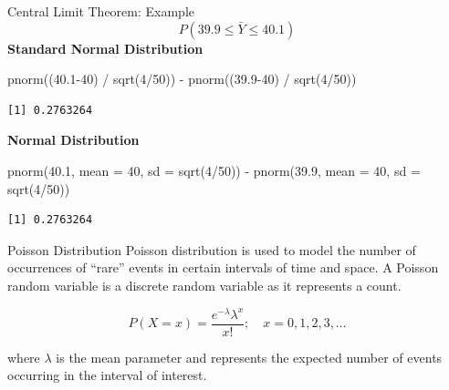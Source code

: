 \documentclass[
  ignorenonframetext,
]{beamer}
\newenvironment{Shaded}{\begin{snugshade}}{\end{snugshade}}
\newcommand{\AttributeTok}[1]{\textcolor[rgb]{0.40,0.45,0.13}{#1}}
\newcommand{\DecValTok}[1]{\textcolor[rgb]{0.68,0.00,0.00}{#1}}
\newcommand{\FloatTok}[1]{\textcolor[rgb]{0.68,0.00,0.00}{#1}}
\newcommand{\FunctionTok}[1]{\textcolor[rgb]{0.28,0.35,0.67}{#1}}
\newcommand{\NormalTok}[1]{\textcolor[rgb]{0.00,0.23,0.31}{#1}}
\newcommand{\SpecialCharTok}[1]{\textcolor[rgb]{0.37,0.37,0.37}{#1}}
\begin{document}
\begin{frame}[fragile]{Central Limit Theorem: Example}
\protect{}\label{central-limit-theorem-example-1}
\[
P(39.9\leq \bar{Y} \leq 40.1)
\] \textbf{Standard Normal Distribution}

\begin{Shaded}
\begin{Highlighting}[]
\FunctionTok{pnorm}\NormalTok{((}\FloatTok{40.1}\DecValTok{{-}40}\NormalTok{) }\SpecialCharTok{/} \FunctionTok{sqrt}\NormalTok{(}\DecValTok{4}\SpecialCharTok{/}\DecValTok{50}\NormalTok{)) }\SpecialCharTok{{-}} \FunctionTok{pnorm}\NormalTok{((}\FloatTok{39.9}\DecValTok{{-}40}\NormalTok{) }\SpecialCharTok{/} \FunctionTok{sqrt}\NormalTok{(}\DecValTok{4}\SpecialCharTok{/}\DecValTok{50}\NormalTok{))}
\end{Highlighting}
\end{Shaded}

\begin{verbatim}
[1] 0.2763264
\end{verbatim}

\textbf{Normal Distribution}

\begin{Shaded}
\begin{Highlighting}[]
\FunctionTok{pnorm}\NormalTok{(}\FloatTok{40.1}\NormalTok{, }\AttributeTok{mean =} \DecValTok{40}\NormalTok{, }\AttributeTok{sd =} \FunctionTok{sqrt}\NormalTok{(}\DecValTok{4}\SpecialCharTok{/}\DecValTok{50}\NormalTok{)) }\SpecialCharTok{{-}} \FunctionTok{pnorm}\NormalTok{(}\FloatTok{39.9}\NormalTok{, }\AttributeTok{mean =} \DecValTok{40}\NormalTok{, }\AttributeTok{sd =} \FunctionTok{sqrt}\NormalTok{(}\DecValTok{4}\SpecialCharTok{/}\DecValTok{50}\NormalTok{)) }
\end{Highlighting}
\end{Shaded}

\begin{verbatim}
[1] 0.2763264
\end{verbatim}
\end{frame}

\begin{frame}{Poisson Distribution}
\protect{}\label{poisson-distribution}
Poisson distribution is used to model the number of occurrences of
``rare'' events in certain intervals of time and space. A Poisson random
variable is a discrete random variable as it represents a count.

\[
P(X=x)=\frac{e^{-\lambda}\lambda^x}{x!}; \quad x=0,1,2,3,\dots
\]

where \(\lambda\) is the mean parameter and represents the expected
number of events occurring in the interval of interest.
\end{frame}
\end{document}
